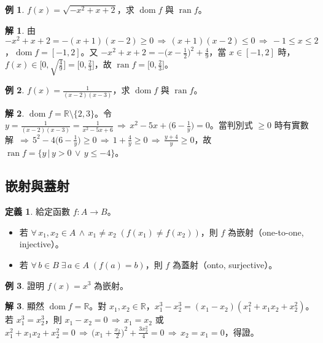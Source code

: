 \documentclass[12pt]{extarticle}
\newcommand{\ds}{\displaystyle}
\newcommand{\ie}{\,\Longrightarrow\,}
\DeclareMathOperator*{\dom}{dom}
\DeclareMathOperator*{\ran}{ran}
\theoremstyle{definition}
\newtheorem*{dfn}{定義}
\newtheorem*{ex}{例}
\newtheorem*{sol}{解}
\begin{document}
\begin{ex}
  $f(x) = \sqrt{-x^2 + x + 2}$，求 $\dom f$ 與 $\ran f$。
\end{ex}

\begin{sol}
  由 $-x^2 + x + 2 = -(x + 1)(x - 2)\geqslant 0 \ie (x + 1)(x - 2)\leqslant 0 \ie -1\leqslant x\leqslant 2$，$\dom f = [-1, 2]$。又 $\ds -x^2 + x + 2 = -\Big(x - \frac{1}{2}\Big)^2 + \frac{4}{9}$，當 $x\in [-1,2]$ 時，$\ds f(x)\in\Big[0, \sqrt{\frac{4}{9}}\Big] = \Big[0, \frac{2}{3}\Big]$，故 $\ds\ran f = \Big[0, \frac{2}{3}\Big]$。
\end{sol}

\begin{ex}
  $\ds f(x) = \frac{1}{(x-2)(x-3)}$，求 $\dom f$ 與 $\ran f$。
\end{ex}

\begin{sol}
  $\dom f = \mathbb{R}\setminus\{2, 3\}$。令 $\ds y = \frac{1}{(x - 2)(x - 3)} = \frac{1}{x^2 - 5x + 6}\ie x^2 - 5 x + \big(6 - \frac{1}{y}\big) = 0$。當判別式 $\geqslant 0$ 時有實數解 $\ds\ie 5^2 - 4\big(6 - \frac{1}{y}\big)\geqslant 0 \ie 1 + \frac{4}{y}\geqslant 0 \ie \frac{y + 4}{y}\geqslant 0$，故 $\ds\ran f = \{y\,|\,y > 0\,\vee\,y\leqslant -4\}$。
\end{sol}

\subsection*{嵌射與蓋射}
\begin{dfn} 給定函數 $f: A\to B$。
  \begin{itemize}\setlength\itemsep{0em}
    \item 若 $\forall\,x_1, x_2\in A\,\wedge\,x_1\not=x_2\; (f(x_1)\not=f(x_2))$，則 $f$ 為嵌射（one-to-one, injective）。
    \item 若 $\forall\,b\in B\;\exists\,a\in A\;(f(a) = b)$，則 $f$ 為蓋射（onto, surjective）。
  \end{itemize}
\end{dfn}

\begin{ex}
  證明 $f(x) = x^3$ 為嵌射。
\end{ex}

\begin{sol}
  顯然 $\dom f = \mathbb{R}$。對 $x_1, x_2\in\mathbb{R}$，$x_1^3 - x_2^3 = (x_1 - x_2)(x_1^2 + x_1 x_2 + x_2^2)$。若 $x_1^3 = x_2^3$，則 $x_1 - x_2 = 0\ie x_1 = x_2$ 或 $\ds x_1^2 + x_1 x_2 + x_2^2 = 0 \ie \Big(x_1 + \frac{x_2}{2}\Big)^2 + \frac{3x_2^2}{4} = 0 \ie x_2 = x_1 = 0$，得證。 
\end{sol}
\end{document}
